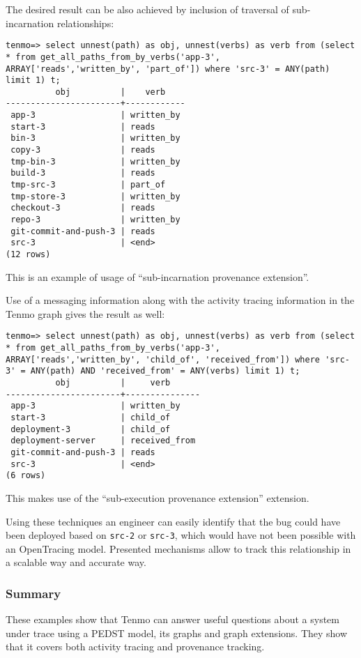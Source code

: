 The desired result can be also achieved by inclusion of traversal of sub-incarnation relationships:
%
\begin{verbatim}
tenmo=> select unnest(path) as obj, unnest(verbs) as verb from (select * from get_all_paths_from_by_verbs('app-3', ARRAY['reads','written_by', 'part_of']) where 'src-3' = ANY(path) limit 1) t;
          obj          |    verb    
-----------------------+------------
 app-3                 | written_by
 start-3               | reads
 bin-3                 | written_by
 copy-3                | reads
 tmp-bin-3             | written_by
 build-3               | reads
 tmp-src-3             | part_of
 tmp-store-3           | written_by
 checkout-3            | reads
 repo-3                | written_by
 git-commit-and-push-3 | reads
 src-3                 | <end>
(12 rows)
\end{verbatim}
%
This is an example of usage of ``sub-incarnation provenance extension''.

Use of a messaging information along with the activity tracing information in the Tenmo graph gives the result as well:
%
\begin{verbatim}
tenmo=> select unnest(path) as obj, unnest(verbs) as verb from (select * from get_all_paths_from_by_verbs('app-3', ARRAY['reads','written_by', 'child_of', 'received_from']) where 'src-3' = ANY(path) AND 'received_from' = ANY(verbs) limit 1) t;
          obj          |     verb      
-----------------------+---------------
 app-3                 | written_by
 start-3               | child_of
 deployment-3          | child_of
 deployment-server     | received_from
 git-commit-and-push-3 | reads
 src-3                 | <end>
(6 rows)
\end{verbatim}
%
This makes use of the ``sub-execution provenance extension'' extension.

Using these techniques an engineer can easily identify that the bug could have been deployed based on \texttt{src-2} or \texttt{src-3}, which would have not been possible with an OpenTracing model. Presented mechanisms allow to track this relationship in a scalable way and accurate way.

\subsubsection{Summary}

These examples show that Tenmo can answer useful questions about a system under trace using a PEDST model, its graphs and graph extensions. They show that it covers both activity tracing and provenance tracking.

